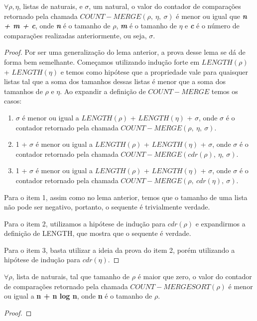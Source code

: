 \begin{lemma}
  \label{cmerge_general_case}
  $\forall \rho, \eta$, listas de naturais, e $\sigma$, um natural,
  o valor do contador de comparações retornado pela chamada 
  $COUNT-MERGE(\rho,\ \eta,\ \sigma)$ é menor ou igual que 
  \textbf{\textit{n + m + c}}, onde \textbf{\textit{n}} é o 
  tamanho de $\rho$, \textbf{\textit{m}} é o tamanho de $\eta$ e
  \textbf{\textit{c}} é o número de comparações realizadas anteriormente, 
  ou seja, $\sigma$.
\end{lemma}

\begin{proof}
  Por ser uma generalização do lema anterior, a prova desse lema se
  dá de forma bem semelhante. Começamos utilizando indução forte em 
  $LENGTH(\rho)$ + $LENGTH(\eta)$ e temos como hipótese que a propriedade
  vale para quaisquer listas tal que a soma dos tamanhos 
  dessas listas é menor que a soma dos tamanhos de $\rho$ e $\eta$.
  Ao expandir a definição de $COUNT-MERGE$ temos os casos:

  \begin{enumerate}
    \item $\sigma$ é menor ou igual a $LENGTH(\rho)$ + $LENGTH(\eta)$ 
      + $\sigma$, onde $\sigma$ é o contador retornado pela
      chamada $COUNT-MERGE(\rho,\ \eta,\ \sigma)$.
     
  \item 1 + $\sigma$ é menor ou igual a 
    $LENGTH(\rho)$ + $LENGTH(\eta)$ + $\sigma$, onde $\sigma$ é o contador
    retornado pela chamada $COUNT-MERGE(cdr(\rho),\ \eta,\ \sigma)$.

  \item 1 + $\sigma$ é menor ou igual a $LENGTH(\rho)$ + 
    $LENGTH(\eta)$ + $\sigma$, onde $\sigma$ é o contador
    retornado pela chamada $COUNT-MERGE(\rho,\ cdr(\eta),\ \sigma)$.
\end{enumerate}

Para o item 1, assim como no lema anterior, temos que o tamanho de uma
lista não pode ser negativo, portanto, o sequente é trivialmente verdade.

Para o item 2, utilizamos a hipótese de indução para $cdr(\rho)$ e 
expandirmos a definição de LENGTH, que mostra que o sequente é verdade.

Para o item 3, basta utilizar a ideia da prova do item 2, porém utilizando
a hipótese de indução para $cdr(\eta)$.
\end{proof}

\begin{lemma}
  \label{merge_sort_ws}
  $\forall \rho$, lista de naturais, tal que tamanho de $\rho$ é maior
  que zero, o valor do contador de comparações retornado pela chamada 
  $COUNT-MERGESORT(\rho)$ é menor ou igual a \textbf{n + n log n}, onde
  \textbf{n} é o tamanho de $\rho$.
\end{lemma}

\begin{proof}
  
\end{proof}